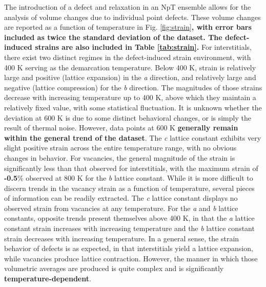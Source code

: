 \documentclass[utf8]{frontiersSCNS} %
\providecommand{\DIFaddtex}[1]{{\bf #1}} %
\providecommand{\DIFdeltex}[1]{} %
\providecommand{\DIFaddbegin}{\protect\color{blue}} %
\providecommand{\DIFaddend}{\protect\color{black}} %
\providecommand{\DIFdelbegin}{\protect\color{red}} %
\providecommand{\DIFdelend}{\protect\color{black}} %
\providecommand{\DIFadd}[1]{\texorpdfstring{\DIFaddtex{#1}}{#1}} %
\providecommand{\DIFdel}[1]{\texorpdfstring{\DIFdeltex{#1}}{}} %
\begin{document}
The introduction of a defect and relaxation in an NpT ensemble allows for the analysis of volume changes due to individual point defects. These volume changes are reported as a function of temperature in Fig. \ref{fig:strain}\DIFdelbegin \DIFdel{. }\DIFdelend \DIFaddbegin \DIFadd{, with error bars included as twice the standard deviation of the dataset. The defect-induced strains are also included in Table \ref{tab:strain}. }\DIFaddend For interstitials, there \DIFdelbegin \DIFdel{clearly }\DIFdelend exist two distinct regimes in the defect-induced strain environment, with 400 K serving as the demarcation temperature. Below 400 K, strain is relatively large and positive (lattice expansion) in the \textit{a} direction, and relatively large and negative (lattice compression) for the \textit{b} direction. The magnitudes of those strains decrease with increasing temperature up to 400 K, above which they maintain a relatively fixed value, with some statistical fluctuation. It is unknown whether the deviation at 600 K is due to some distinct behavioral changes, or is simply the result of thermal noise. However, data points at 600 K \DIFdelbegin \DIFdel{remains within the standard error of the general trend (standard error not shown here for readability of figures), which implies that it is unlikely to indicate a change in behavior}\DIFdelend \DIFaddbegin \DIFadd{generally remain within the general trend of the dataset}\DIFaddend . The \textit{c} lattice constant exhibits very slight positive strain across the entire temperature range, with no obvious changes in behavior. For vacancies, the general magnitude of the strain is significantly less than that observed for interstitials, with the maximum strain of \DIFdelbegin \DIFdel{0.5}\DIFdelend \DIFaddbegin \DIFadd{-0.5}\DIFaddend \% observed at 800 K for the \textit{b} lattice constant. While it is more difficult to discern trends in the vacancy strain as a function of temperature, several pieces of information can be readily extracted. The \textit{c} lattice constant displays no observed strain from vacancies at any temperature. For the \textit{a} and \textit{b} lattice constants, opposite trends present themselves above 400 K, in that the \textit{a} lattice constant strain increases with increasing temperature and the \textit{b} lattice constant strain decreases with increasing temperature. In a general sense, the strain behavior of defects is as expected, in that interstitials yield a lattice expansion, while vacancies produce lattice contraction. However, the manner in which those volumetric averages are produced is quite complex \DIFdelbegin \DIFdel{, }\DIFdelend and is significantly \DIFdelbegin \DIFdel{temperature dependent}\DIFdelend \DIFaddbegin \DIFadd{temperature-dependent}\DIFaddend . 
\end{document}
